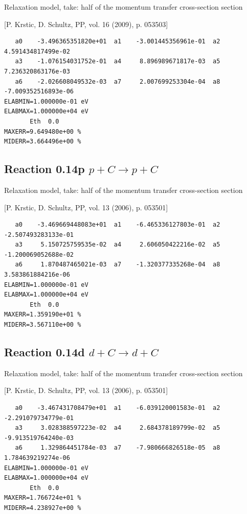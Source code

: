 \documentclass[12pt,dvipdfmx]{article}
\begin{document}
Relaxation model, take: half of the momentum transfer cross-section
section

[P. Krstic, D. Schultz, PP, vol. 16 (2009), p. 053503]

\begin{small}\begin{verbatim}
   a0    -3.496365351820e+01  a1    -3.001445356961e-01  a2     4.591434817499e-02
   a3    -1.076154031752e-01  a4     8.896989671817e-03  a5     7.236320863176e-03
   a6    -2.026608049532e-03  a7     2.007699253304e-04  a8    -7.009352516893e-06
ELABMIN=1.000000e-01 eV
ELABMAX=1.000000e+04 eV
       Eth  0.0
MAXERR=9.649480e+00 %
MIDERR=3.664496e+00 %
\end{verbatim}\end{small}

\newpage

\subsection{
Reaction 0.14p   $ p + C \rightarrow p + C $
}

Relaxation model, take: half of the momentum transfer cross-section
section

[P. Krstic, D. Schultz, PP, vol. 13 (2006), p. 053501]

\begin{small}\begin{verbatim}
   a0    -3.469669448083e+01  a1    -6.465336127803e-01  a2    -2.507493283133e-01
   a3     5.150725759535e-02  a4     2.606050422216e-02  a5    -1.200069052688e-02
   a6     1.870487465021e-03  a7    -1.320377335268e-04  a8     3.583861884216e-06
ELABMIN=1.000000e-01 eV
ELABMAX=1.000000e+04 eV
       Eth  0.0
MAXERR=1.359190e+01 %
MIDERR=3.567110e+00 %
\end{verbatim}\end{small}

\subsection{
Reaction 0.14d   $ d + C \rightarrow d + C $
}

Relaxation model, take: half of the momentum transfer cross-section
section

[P. Krstic, D. Schultz, PP, vol. 13 (2006), p. 053501]

\begin{small}\begin{verbatim}
   a0    -3.467431708479e+01  a1    -6.039120001583e-01  a2    -2.291079734779e-01
   a3     3.028388597223e-02  a4     2.684378189799e-02  a5    -9.913519764240e-03
   a6     1.329864451784e-03  a7    -7.980666826518e-05  a8     1.784639219274e-06
ELABMIN=1.000000e-01 eV
ELABMAX=1.000000e+04 eV
       Eth  0.0
MAXERR=1.766724e+01 %
MIDERR=4.238927e+00 %
\end{verbatim}\end{small}
\end{document}
